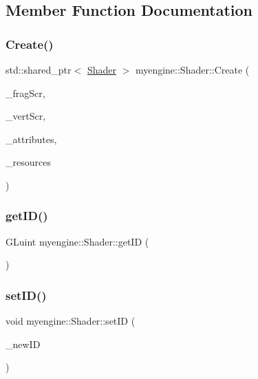 \subsection{Member Function Documentation}
\mbox{\label{classmyengine_1_1_shader_a0b65f89c7c9813f76c17a3e4a26b2ae5}} 
\subsubsection{\texorpdfstring{Create()}{Create()}}
{\footnotesize\ttfamily std\+::shared\+\_\+ptr$<$ \hyperlink{classmyengine_1_1_shader}{Shader} $>$ myengine\+::\+Shader\+::\+Create (\begin{DoxyParamCaption}\item[{std\+::string}]{\+\_\+frag\+Scr,  }\item[{std\+::string}]{\+\_\+vert\+Scr,  }\item[{std\+::vector$<$ G\+Lchar $\ast$$>$}]{\+\_\+attributes,  }\item[{std\+::shared\+\_\+ptr$<$ \hyperlink{classmyengine_1_1_resources}{Resources} $>$}]{\+\_\+resources }\end{DoxyParamCaption})\hspace{0.3cm}{\ttfamily [static]}}

\mbox{\label{classmyengine_1_1_shader_a2849648cdf31caa5c0ba50a639091387}} 
\subsubsection{\texorpdfstring{get\+I\+D()}{getID()}}
{\footnotesize\ttfamily G\+Luint myengine\+::\+Shader\+::get\+ID (\begin{DoxyParamCaption}{ }\end{DoxyParamCaption})}

\mbox{\label{classmyengine_1_1_shader_a9753467c609016a7c1c7a1156da2533f}} 
\subsubsection{\texorpdfstring{set\+I\+D()}{setID()}}
{\footnotesize\ttfamily void myengine\+::\+Shader\+::set\+ID (\begin{DoxyParamCaption}\item[{G\+Luint}]{\+\_\+new\+ID }\end{DoxyParamCaption})}

